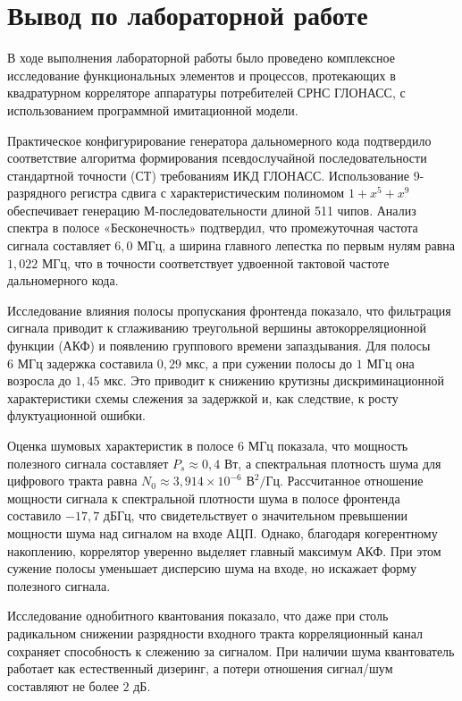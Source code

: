 
\section{Вывод по лабораторной работе}

В ходе выполнения лабораторной работы было проведено комплексное исследование функциональных элементов и процессов, протекающих в квадратурном корреляторе аппаратуры потребителей СРНС ГЛОНАСС, с использованием программной имитационной модели.

Практическое конфигурирование генератора дальномерного кода подтвердило соответствие алгоритма формирования псевдослучайной последовательности стандартной точности (СТ) требованиям ИКД ГЛОНАСС. Использование 9-разрядного регистра сдвига с характеристическим полиномом \(1 + x^5 + x^9\) обеспечивает генерацию М-последовательности длиной 511 чипов. Анализ спектра в полосе «Бесконечность» подтвердил, что промежуточная частота сигнала составляет \(6{,}0\text{ МГц}\), а ширина главного лепестка по первым нулям равна \(1{,}022\text{ МГц}\), что в точности соответствует удвоенной тактовой частоте дальномерного кода.

Исследование влияния полосы пропускания фронтенда показало, что фильтрация сигнала приводит к сглаживанию треугольной вершины автокорреляционной функции (АКФ) и появлению группового времени запаздывания. Для полосы \(6\text{ МГц}\) задержка составила \(0{,}29\text{ мкс}\), а при сужении полосы до \(1\text{ МГц}\) она возросла до \(1{,}45\text{ мкс}\). Это приводит к снижению крутизны дискриминационной характеристики схемы слежения за задержкой и, как следствие, к росту флуктуационной ошибки. 

Оценка шумовых характеристик в полосе \(6\text{ МГц}\) показала, что мощность полезного сигнала составляет \(P_s \approx 0{,}4\text{ Вт}\), а спектральная плотность шума для цифрового тракта равна \(N_0 \approx 3{,}914 \times 10^{-6}\text{ В}^2/\text{Гц}\). Рассчитанное отношение мощности сигнала к спектральной плотности шума в полосе фронтенда составило \(-17{,}7\text{ дБГц}\), что свидетельствует о значительном превышении мощности шума над сигналом на входе АЦП. Однако, благодаря когерентному накоплению, коррелятор уверенно выделяет главный максимум АКФ. При этом сужение полосы уменьшает дисперсию шума на входе, но искажает форму полезного сигнала.

Исследование однобитного квантования показало, что даже при столь радикальном снижении разрядности входного тракта корреляционный канал сохраняет способность к слежению за сигналом. При наличии шума квантователь работает как естественный дизеринг, а потери отношения сигнал/шум составляют не более \(2\text{ дБ}\).

